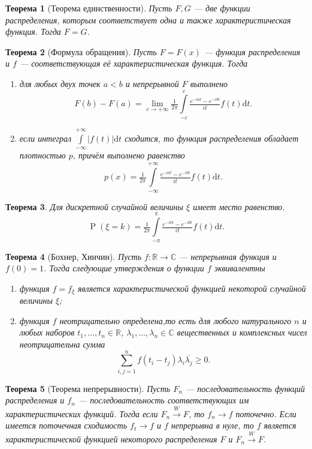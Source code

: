 \documentclass[12pt]{article}
\newtheorem{theorem}{Теорема}
\numberwithin{theorem}{section}
\theoremstyle{definition}
\newcommand{\CC}{\mathbb{C}}
\newcommand{\RR}{\mathbb{R}}
\newcommand{\prob}{\operatorname{P}}
\newcommand{\diff}{\mathrm{d}}
\begin{document}
	\begin{theorem}[Теорема единственности]
		Пусть $ F, G $ --- две функции распределения, которым соответствует одна и также характеристическая функция.
		Тогда $ F = G $.
	\end{theorem}
	
	\begin{theorem}[Формула обращения]
		Пусть $ F = F(x) $ --- функция распределения и $ f $ --- соответствующая её характеристическая функция.
		Тогда
		\begin{enumerate}
			\item для любых двух точек $ a < b $ и непрерывной $ F $ выполнено
			$$ F(b) - F(a) 
			= \lim\limits_{c \to +\infty} \tfrac{1}{2\pi} \int\limits_{-c}^{c} \tfrac{e^{-iat} - e^{-ibt}}{it}f(t) \diff t. $$
			\item если интеграл $ \int\limits_{-\infty}^{+\infty} |f(t)|\diff t $ сходится,
			то функция распределения обладает плотностью $ p $, причём выполнено равенство
			$$ p(x) = \tfrac{1}{2\pi} \int\limits_{-\infty}^{+\infty} \tfrac{e^{-iat} - e^{-ibt}}{it}f(t) \diff t. $$
		\end{enumerate}
	\end{theorem}
	
	\begin{theorem}
		Для дискретной случайной величины $ \xi $ имеет место равенство.
		$$ \prob(\xi = k) = \tfrac{1}{2\pi} \int\limits_{-\pi}^{\pi} \tfrac{e^{-itk} - e^{-ibt}}{it}f(t) \diff t. $$
	\end{theorem}
	
	\begin{theorem}[Бохнер, Хинчин]
		Пусть $ f \colon \RR \to \CC $ --- непрерывная функция и $ f(0) = 1 $.
		Тогда следующие утверждения о функции $ f $ эквивалентны
		\begin{enumerate}
			\item функция $ f = f_\xi $ является характеристической функцией некоторой случайной величины $ \xi $;
			\item функция $ f $ неотрицательно определена,то есть для любого натурального $ n $
			и любых наборов $ t_1, \ldots, t_n \in \RR $, $ \lambda_1, \ldots, \lambda_n \in \CC $
			вещественных и комплексных чисел неотрицательна
			сумма 
			$$ \sum\limits_{i,j = 1}^{n} f(t_i - t_j)\lambda_i\overline{\lambda_j} \geqslant 0. $$
		\end{enumerate}
	\end{theorem}
	
	\begin{theorem}[Теорема непрерывности]
		Пусть $ F_n $ --- последовательность функций распределения и $ f_n $
		--- последовательность соответствующих им характеристических функций.
		Тогда если $ F_n \overset{W}{\to} F $, то $ f_n \to f $ поточечно.
		Если имеется поточечная сходимость $ f_t \to f $ и $ f $ непрерывна в нуле,
		то $ f $ является характеристической функцией некоторого распределения $ F $
		и $ F_n \overset{W}{\to} F $.
	\end{theorem}
	
\end{document}
